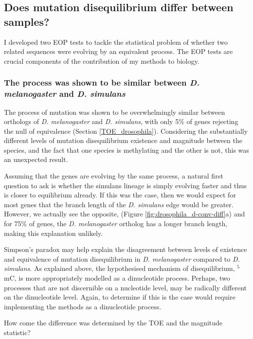 \subsection{Does mutation disequilibrium differ between samples?}

I developed two EOP tests to tackle the statistical problem of whether two related sequences were evolving by an equivalent process. The EOP tests are crucial components of the contribution of my methods to biology. 

\subsubsection{The process was shown to be similar between \textit{D. melanogaster} and \textit{D. simulans} }

The process of mutation was shown to be overwhelmingly similar between orthologs of \textit{D. melanogaster} and \textit{D. simulans}, with only 5\% of genes rejecting the null of equivalence (Section \ref{TOE_drosophila}). Considering the substantially different levels of mutation disequilibrium existence and magnitude between the species, and the fact that one species is methylating and the other is not, this was an unexpected result. 

Assuming that the genes are evolving by the same process, a natural first question to ask is whether the simulans lineage is simply evolving faster and thus is closer to equilibrium already. If this was the case, then we would expect for most genes that the branch length of the \textit{D. simulans} edge would be greater. However, we actually see the opposite, (Figure \ref{fig:drosophila_d-conv-diff}a) and for 75\% of genes, the \textit{D. melanogaster} ortholog has a longer branch length, making this explanation unlikely. 

Simpson's paradox may help explain the disagreement between levels of existence and equivalence of mutation disequilibrium in \textit{D. melanogaster} compared to \textit{D. simulans}. As explained above, the hypothesised mechanism of disequilibrium, $^5$mC, is more appropriately modelled as a dinucleotide process. Perhaps, two processes that are not discernible on a nucleotide level, may be radically different on the dinucleotide level. Again, to determine if this is the case would require implementing the methods as a dinucleotide process. 

How come the difference was determined by the TOE and the magnitude statistic?

